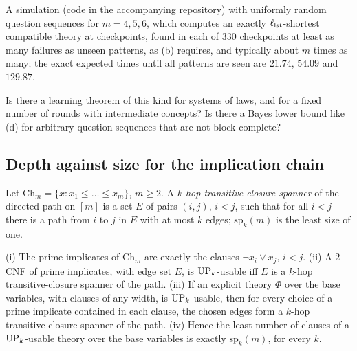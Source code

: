 A simulation (code in the accompanying repository) with uniformly random question sequences for $m=4,5,6$, which computes an exactly $\ell_{\rm lst}$-shortest compatible theory at checkpoints, found in each of $330$ checkpoints at least as many failures as unseen patterns, as (b) requires, and typically about $m$ times as many; the exact expected times until all patterns are seen are $21.74$, $54.09$ and $129.87$.

\begin{question}\label{q:shape:learning}
Is there a learning theorem of this kind for systems of laws, and for a fixed number of rounds with intermediate concepts? Is there a Bayes lower bound like (d) for arbitrary question sequences that are not block-complete?
\end{question}

\subsection{Depth against size for the implication chain}\label{app:shape:spanner}

Let $\mathrm{Ch}_m=\{x:x_1\le\dots\le x_m\}$, $m\ge2$. A \emph{$k$-hop transitive-closure spanner} of the directed path on $[m]$ is a set $E$ of pairs $(i,j)$, $i<j$, such that for all $i<j$ there is a path from $i$ to $j$ in $E$ with at most $k$ edges; $\mathrm{sp}_k(m)$ is the least size of one.

\begin{theorem}\label{thm:shape:spanner}
(i) The prime implicates of $\mathrm{Ch}_m$ are exactly the clauses $\neg x_i\vee x_j$, $i<j$.
(ii) A $2$-CNF of prime implicates, with edge set $E$, is $\mathrm{UP}_k$-usable iff $E$ is a $k$-hop transitive-closure spanner of the path.
(iii) If an explicit theory $\Phi$ over the base variables, with clauses of any width, is $\mathrm{UP}_k$-usable, then for every choice of a prime implicate contained in each clause, the chosen edges form a $k$-hop transitive-closure spanner of the path.
(iv) Hence the least number of clauses of a $\mathrm{UP}_k$-usable theory over the base variables is exactly $\mathrm{sp}_k(m)$, for every $k$.
\end{theorem}

